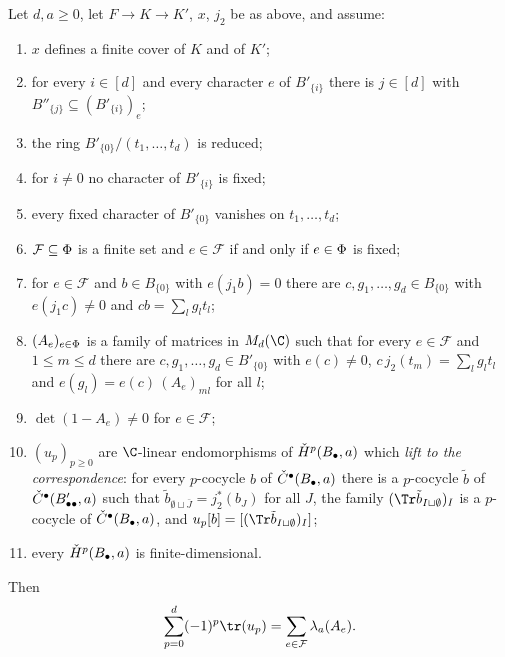 \begin{theorem}\label{pf:hlf-chart:main}
Let $d,a\ge0$, let $F\to K\to K'$, $x$, $j_2$ be as above, and assume:
\begin{enumerate}[label=\textup{(H\arabic*)},nosep]
\item\label{pf:hlf-chart:H1} $x$ defines a finite cover of $K$ and of $K'$;
\item\label{pf:hlf-chart:H2} for every $i\in[d]$ and every character $e$ of $B'_{\{i\}}$ there is $j\in[d]$ with $B''_{\{j\}}\subseteq(B'_{\{i\}})_e$;
\item\label{pf:hlf-chart:H3} the ring $B'_{\{0\}}/(t_1,\dots,t_d)$ is reduced;
\item\label{pf:hlf-chart:H4} for $i\ne0$ no character of $B'_{\{i\}}$ is fixed;
\item\label{pf:hlf-chart:H5} every fixed character of $B'_{\{0\}}$ vanishes on $t_1,\dots,t_d$;
\item\label{pf:hlf-chart:H6} $\mathcal F\subseteq\Phi$ is a finite set and $e\in\mathcal F$ if and only if $e\in\Phi$ is fixed;
\item\label{pf:hlf-chart:H7} for $e\in\mathcal F$ and $b\in B_{\{0\}}$ with $e(j_1b)=0$ there are $c,g_1,\dots,g_d\in B_{\{0\}}$ with $e(j_1c)\ne0$ and
$cb=\sum_lg_lt_l$;
\item\label{pf:hlf-chart:H8} $(A_e)_{e\in\Phi}$ is a family of matrices in $M_d(\C)$ such that for every $e\in\mathcal F$ and $1\le m\le d$
there are $c,g_1,\dots,g_d\in B'_{\{0\}}$ with $e(c)\ne0$, $c\,j_2(t_m)=\sum_lg_lt_l$ and $e(g_l)=e(c)\,(A_e)_{ml}$ for all $l$;
\item\label{pf:hlf-chart:H9} $\det(1-A_e)\ne0$ for $e\in\mathcal F$;
\item\label{pf:hlf-chart:H10} $(u_p)_{p\ge0}$ are $\C$-linear endomorphisms of $\check{H}^p(B_\bullet,a)$ which \emph{lift to the correspondence}: for
every $p$-cocycle $b$ of $\check{C}^\bullet(B_\bullet,a)$ there is a $p$-cocycle $\tilde b$ of $\check{C}^\bullet(B'_{\bullet\bullet},a)$ such that
$\tilde b_{\emptyset\sqcup\bar J}=j_2^*(b_J)$ for all $J$, the family $(\Tr\tilde b_{I\sqcup\emptyset})_I$ is a $p$-cocycle of
$\check{C}^\bullet(B_\bullet,a)$, and $u_p[b]=[(\Tr\tilde b_{I\sqcup\emptyset})_I]$;
\item\label{pf:hlf-chart:H11} every $\check{H}^p(B_\bullet,a)$ is finite-dimensional.
\end{enumerate}
Then
\[
  \sum_{p=0}^{d}(-1)^p\tr(u_p)=\sum_{e\in\mathcal F}\hlfcloc_a(A_e).
\]
\end{theorem}

